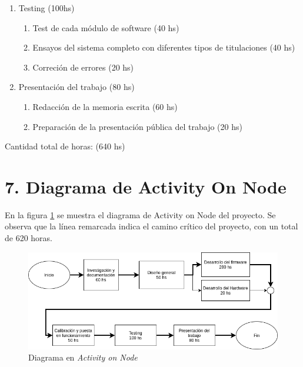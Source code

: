 \documentclass[11pt]{charter}
\begin{document}
\begin{enumerate}
\item Testing (100hs)
	\begin{enumerate}	
	\item Test de cada módulo de software (40 hs)
	\item Ensayos del sistema completo con diferentes tipos de titulaciones (40 hs)
	\item Correción de errores (20 hs)
	\end{enumerate}
\item Presentación del trabajo (80 hs)
	\begin{enumerate}
	\item Redacción de la memoria escrita (60 hs)
	\item Preparación de la presentación pública del trabajo (20 hs)	
	\end{enumerate}
\end{enumerate}

Cantidad total de horas: (640 hs)

\vspace{25px}

\section{7. Diagrama de Activity On Node}
\label{sec:AoN}
En la figura \ref{fig:AoN} se muestra el diagrama de Activity on Node del proyecto. Se observa que la línea remarcada indica el camino crítico del proyecto, con un total de 620 horas.

\begin{figure}[htpb]
\centering 
\includegraphics[width=1\textwidth]{./Figuras/AoN.png}
\caption{Diagrama en \textit{Activity on Node}}
\label{fig:AoN}
\end{figure}
\end{document}
